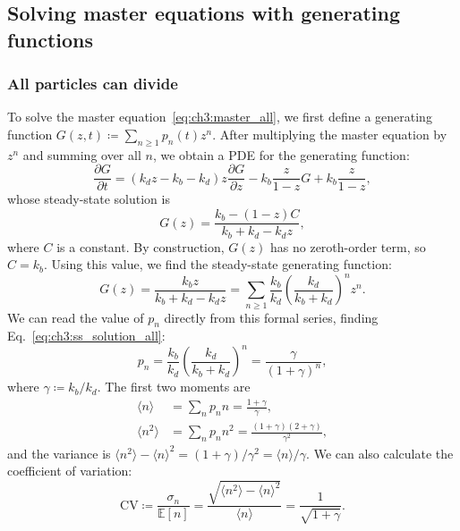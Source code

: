 \subsection{Solving master equations with generating functions}
\label{sec:ch3:gen_func}

\subsubsection{All particles can divide}
\label{sec:ch3:gen_func_1}

To solve the master equation~\eqref{eq:ch3:master_all}, we first define a generating function $G(z,t)\coloneq\sum_{n\geqslant 1} p_n(t) z^n$. After multiplying the master equation by $z^n$ and summing over all $n$, we obtain a PDE for the generating function:
\begin{equation}
    \frac{\partial G}{\partial t}=(k_dz -k_b-k_d)z\frac{\partial G}{\partial z}-k_b\frac{z}{1-z}G+k_b\frac{z}{1-z},
\end{equation}
whose steady-state solution is
\begin{equation}\label{eq:ch3:G_steadystate_intermediate}
    G(z)=\frac{k_b-(1-z)C}{k_b+k_d-k_dz},
\end{equation}
where $C$ is a constant. By construction, $G(z)$ has no zeroth-order term, so $C=k_b$. Using this value, we find the steady-state generating function:
\begin{equation}
    G(z)=\frac{k_b z}{k_b+k_d-k_d z}=\sum_{n\geqslant 1}\frac{k_b}{k_d}\left(\frac{k_d}{k_b+k_d}\right)^n z^n.
\end{equation}
We can read the value of $p_n$ directly from this formal series, finding Eq.~\eqref{eq:ch3:ss_solution_all}:
\begin{equation}\label{eq:ch3:app_pn_all}
    p_n = \frac{k_b}{k_d}\left(\frac{k_d}{k_b+k_d}\right)^n = \frac{\gamma}{(1+\gamma)^n},
\end{equation}
where $\gamma\coloneq k_b/k_d$. The first two moments are
\begin{subequations}
\begin{align}
    \langle n \rangle &= \sum_{n} p_n n = \frac{1+\gamma}{\gamma},\\
    \langle n^2\rangle &= \sum_{n} p_n n^2 = \frac{(1+\gamma)(2+\gamma)}{\gamma^2},
\end{align}
\end{subequations}
and the variance is $\langle n^2\rangle-\langle n\rangle^2 = (1+\gamma)/\gamma^2=\langle n\rangle/\gamma$. We can also calculate the coefficient of variation:
\begin{equation}
    \mathrm{CV}\coloneq\frac{\sigma_n}{\mathbb{E}[n]}=\frac{ \sqrt{\langle n^2\rangle-\langle n\rangle^2}}{\langle n\rangle}=\frac{1}{\sqrt{1+\gamma}}.
\end{equation}

